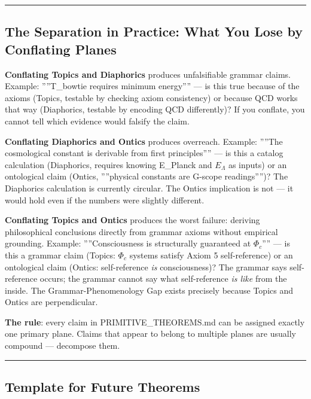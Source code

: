 \documentclass[11pt,a4paper]{article}
\begin{document}
\begin{center}
\rule{0.5\textwidth}{0.4pt}
\end{center}

\subsection{The Separation in Practice: What You Lose by Conflating Planes}

\textbf{Conflating Topics and Diaphorics} produces unfalsifiable grammar claims. Example: ''''T\_bowtie requires minimum energy'''' --- is this true because of the axioms (Topics, testable by checking axiom consistency) or because QCD works that way (Diaphorics, testable by encoding QCD differently)? If you conflate, you cannot tell which evidence would falsify the claim.

\textbf{Conflating Diaphorics and Ontics} produces overreach. Example: ''''The cosmological constant is derivable from first principles'''' --- is this a catalog calculation (Diaphorics, requires knowing E\_Planck and $E_{\Lambda}$ as inputs) or an ontological claim (Ontics, ''''physical constants are G-scope readings'''')? The Diaphorics calculation is currently circular. The Ontics implication is not --- it would hold even if the numbers were slightly different.

\textbf{Conflating Topics and Ontics} produces the worst failure: deriving philosophical conclusions directly from grammar axioms without empirical grounding. Example: ''''Consciousness is structurally guaranteed at $\Phi_c$'''' --- is this a grammar claim (Topics: $\Phi_c$ systems satisfy Axiom 5 self-reference) or an ontological claim (Ontics: self-reference \emph{is} consciousness)? The grammar says self-reference occurs; the grammar cannot say what self-reference \emph{is like} from the inside. The Grammar-Phenomenology Gap exists precisely because Topics and Ontics are perpendicular.

\textbf{The rule}: every claim in PRIMITIVE\_THEOREMS.md can be assigned exactly one primary plane. Claims that appear to belong to multiple planes are usually compound --- decompose them.

\begin{center}
\rule{0.5\textwidth}{0.4pt}
\end{center}

\subsection{Template for Future Theorems}
\end{document}

